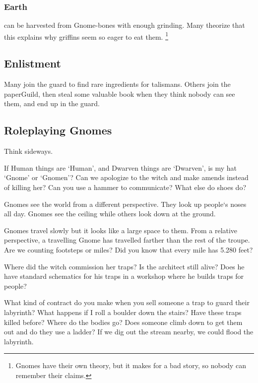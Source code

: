 \begin{multicols}{2}
\subsubsection{Earth }
can be harvested from Gnome-bones with enough grinding.
Many theorize that this explains why \glspl{griffin} seem so eager to eat them.%
\footnote{Gnomes have their own theory, but it makes for a bad story, so nobody can remember their claims.}

\subsection{Enlistment}

Many join the \gls{guard} to find rare \glspl{ingredient} for \glspl{talisman}.
Others join the \gls{paperGuild}, then steal some valuable book when they think nobody can see them, and end up in the \gls{guard}.

\subsection{Roleplaying Gnomes}

{\raggedleft Think sideways.\par}
\noindent
If Human things are `Human', and Dwarven things are `Dwarven', is my hat `Gnome' or `Gnomen'?
Can we apologize to the \gls{witch} and make amends instead of killing her?
Can you use a hammer to communicate?
What else do shoes do?

Gnomes see the world from a different perspective.
They look up people`s noses all day.
Gnomes see the ceiling while others look down at the ground.

Gnomes travel slowly but it looks like a large space to them.
From a relative perspective, a travelling Gnome has travelled farther than the rest of the troupe.
Are we counting footsteps or miles?
Did you know that every mile has 5.280 feet?

Where did the \gls{witch} commission her traps?
Is the architect still alive?
Does he have standard schematics for his traps in a workshop where he builds traps for people?

What kind of contract do you make when you sell someone a trap to guard their labyrinth?
What happens if I roll a boulder down the stairs?
Have these traps killed before?
Where do the bodies go?
Does someone climb down to get them out and do they use a ladder?
If we dig out the stream nearby, we could flood the labyrinth.

\end{multicols}

